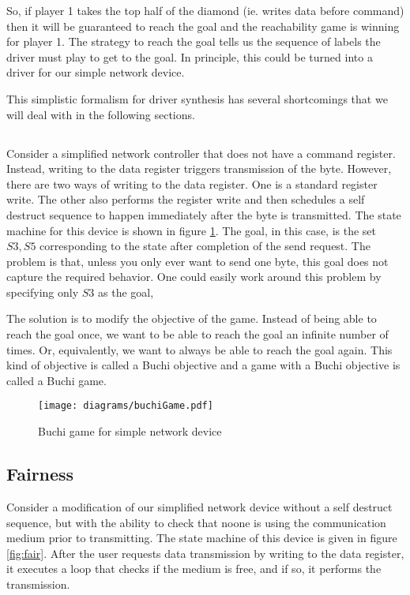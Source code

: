 So, if player 1 takes the top half of the diamond (ie. writes data before command) then it will be guaranteed to reach the goal and the reachability game is winning for player 1. The strategy to reach the goal tells us the sequence of labels the driver must play to get to the goal. In principle, this could be turned into a driver for our simple network device.

This simplistic formalism for driver synthesis has several shortcomings that we will deal with in the following sections.

\subsection{\buchi}

Consider a simplified network controller that does not have a command register. Instead, writing to the data register triggers transmission of the byte. However, there are two ways of writing to the data register. One is a standard register write. The other also performs the register write and then schedules a self destruct sequence to happen immediately after the byte is transmitted. The state machine for this device is shown in figure \ref{fig:buchi}. The goal, in this case, is the set ${S3, S5}$ corresponding to the state after completion of the send request. The problem is that, unless you only ever want to send one byte, this goal does not capture the required behavior. One could easily work around this problem by specifying only ${S3}$ as the goal, 

The solution is to modify the objective of the game. Instead of being able to reach the goal once, we want to be able to reach the goal an infinite number of times. Or, equivalently, we want to always be able to reach the goal again. This kind of objective is called a Buchi objective and a game with a Buchi objective is called a Buchi game. 

\begin{figure}[t]
\centering
\texttt{[image: diagrams/buchiGame.pdf]}
\caption{Buchi game for simple network device}
\label{fig:buchi}
\end{figure}

\subsection{Fairness}

Consider a modification of our simplified network device without a self destruct sequence, but with the ability to check that noone is using the communication medium prior to transmitting. The state machine of this device is given in figure \ref{fig:fair}. After the user requests data transmission by writing to the data register, it executes a loop that checks if the medium is free, and if so, it performs the transmission. 

